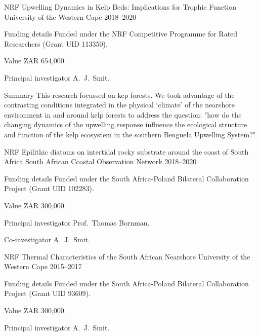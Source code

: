 \begin{cventries}

\cventry
{NRF} %
{Upwelling Dynamics in Kelp Beds: Implications for Trophic Function} %
{University of the Western Cape} %
{2018--2020} %
{ %
\begin{cvdescription}
    \item[Funding details] Funded under the NRF Competitive Programme for Rated Researchers (Grant UID 113350).
    \item[Value] {ZAR 654,000.}
    \item[Principal investigator] A.~J.~Smit.
    \item[Summary] {
        This research focussed on kep forests. We took advantage of the contrasting conditions integrated in the physical ‘climate’ of the nearshore environment in and around kelp forests to address the question: "how do the changing dynamics of the upwelling response influence the ecological structure and function of the kelp ecosystem in the southern Benguela Upwelling System?"}
\end{cvdescription}
}


\cventry
{NRF} %
{Epilithic diatoms on intertidal rocky substrate around the coast of South Africa} %
{South African Coastal Observation Network} %
{2018--2020} %
{ %
\begin{cvdescription}
    \item[Funding details] Funded under the South Africa-Poland Bilateral Collaboration Project (Grant UID 102283).
    \item[Value] {ZAR 300,000.}
    \item[Principal investigator] Prof.~Thomas Bornman.
    \item[Co-investigator] A.~J.~Smit.
\end{cvdescription}
}


\cventry
{NRF} %
{Thermal Characteristics of the South African Nearshore} %
{University of the Western Cape} %
{2015--2017} %
{ %
\begin{cvdescription}
    \item[Funding details] Funded under the South Africa-Poland Bilateral Collaboration Project (Grant UID 93609).
    \item[Value] {ZAR 300,000.}
    \item[Principal investigator] A.~J.~Smit.
\end{cvdescription}
}


\end{cventries}
